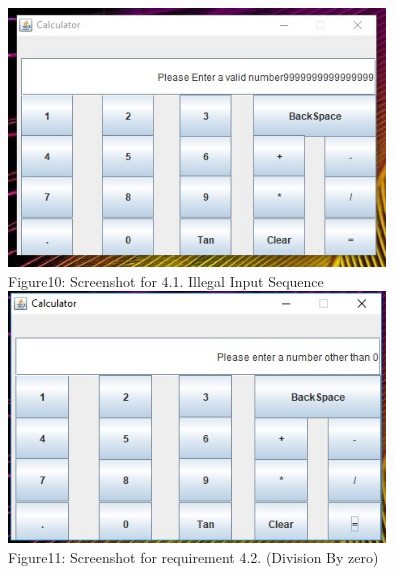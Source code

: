 \documentclass[a4paper,12pt]{article}
\begin{document}
\begin{titlepage}
\newline
\newline
\includegraphics[width=10.0cm]{F10.jpg}\\
Figure10: Screenshot for  4.1. Illegal Input Sequence  \\
\newline
\newline
\includegraphics[width=10.0cm]{F11.jpg}\\
Figure11: Screenshot for requirement 4.2. (Division By zero)  \\
\newline

\end{titlepage}
\end{document}
